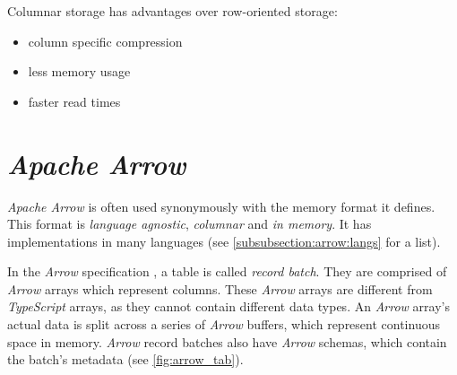 Columnar storage has advantages over row-oriented storage:
\begin{itemize}
	\item column specific compression \autocite{Abadi2013}
	\item less memory usage \autocite{Abadi2013}
	\item faster read times \autocite{Floratou2019}
\end{itemize}


\section{\emph{Apache Arrow}}
\label{section:arrow}

\emph{Apache Arrow} is often used synonymously with the memory format it defines.
This format is \emph{language agnostic}, \emph{columnar} and \emph{in memory}.
It has implementations in many languages \autocite{arrow:overview} (see \autoref{subsubsection:arrow:langs} for a list).

In the \emph{Arrow} specification \autocite{arrow:spec}, a table is called \emph{record batch}.
They are comprised of \emph{Arrow} arrays which represent columns.
These \emph{Arrow} arrays are different from \emph{TypeScript} arrays, as they cannot contain different data types.
An \emph{Arrow} array's actual data is split across a series of \emph{Arrow} buffers, which represent continuous space in memory.
\emph{Arrow} record batches also have \emph{Arrow} schemas, which contain the batch's metadata (see \autoref{fig:arrow_tab}).

